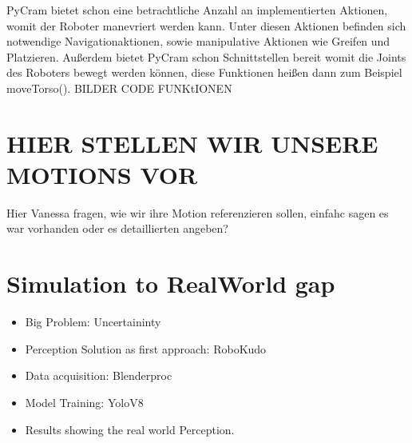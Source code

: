 PyCram bietet schon eine betrachtliche Anzahl an implementierten Aktionen, womit der Roboter manevriert werden kann. Unter diesen Aktionen befinden sich notwendige Navigationaktionen, sowie manipulative Aktionen wie Greifen und Platzieren. Außerdem bietet PyCram schon Schnittstellen bereit womit die Joints des Roboters bewegt werden können, diese Funktionen heißen dann zum Beispiel moveTorso().
BILDER CODE FUNKtIONEN

\section*{HIER STELLEN WIR UNSERE MOTIONS VOR}
Hier Vanessa fragen, wie wir ihre Motion referenzieren sollen, einfahc sagen es war vorhanden oder es detaillierten angeben?

\section*{Simulation to RealWorld gap}
\begin{itemize}
	\item Big Problem: Uncertaininty
	\item Perception Solution as first approach: RoboKudo
	\item Data acquisition: Blenderproc
	\item Model Training: YoloV8
	\item Results showing the real world Perception.
\end{itemize}